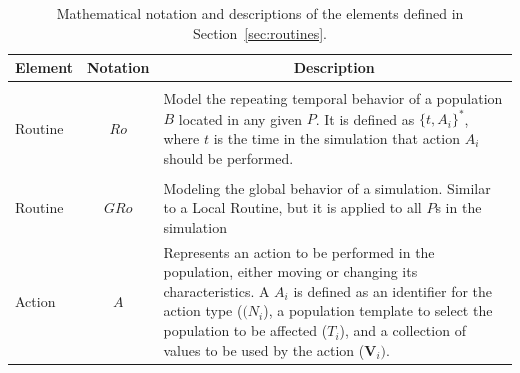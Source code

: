\documentclass[pdflatex,sn-mathphys-num]{sn-jnl}%
\newcommand\redb[1]{#1}
\theoremstyle{thmstyleone}%
\theoremstyle{thmstyletwo}%
\theoremstyle{thmstylethree}%
\begin{document}
\begin{table}[h]
\redb{
\footnotesize
\centering
\caption{Mathematical notation and descriptions of the elements defined in Section~\ref{sec:routines}.}
\label{tbl:notation_rout}
\begin{tabularx}{\linewidth}{@{}lcX@{}}
\toprule
\textbf{Element}                                                             & \textbf{Notation} & \multicolumn{1}{c}{\textbf{Description}} \\ \midrule
\begin{tabular}[c]{@{}l@{}}Local\\ Routine\end{tabular}            & $Ro$       & Model the repeating temporal behavior of a population $B$ located in any given $P$. It is defined as $\{t,A_i\}^\ast$, where $t$ is the time in the simulation that action $A_i$ should be performed.                                                                                                               \\ \midrule
\begin{tabular}[c]{@{}l@{}}Global\\ Routine\end{tabular}           & $GRo$      & Modeling the global behavior of a simulation. Similar to a Local Routine, but it is applied to all $P$s in the simulation                                                                                                                                                                                           \\ \midrule
Action                                                             & $A$        & Represents an action to be performed in the population, either moving or changing its characteristics. A $A_i$ is defined as an identifier for the action type ($(N_{i}$), a population template to select the population to be affected ($T_{i}$), and a collection of values to be used by the action ($\bm{V}_{i})$. \\ \bottomrule
\end{tabularx}
} %
\end{table}

\end{document}
